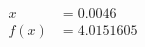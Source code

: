 \documentclass[preview]{standalone}
\begin{document}
\begin{align*}
x &= 0.0046\\f(x) &= 4.0151605
\end{align*}
\end{document}
